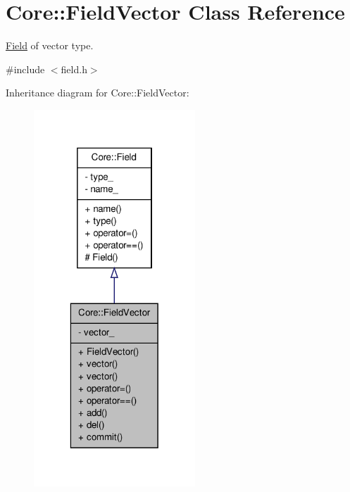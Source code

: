 \hypertarget{classCore_1_1FieldVector}{
\section{Core::FieldVector Class Reference}
\label{dc/d7f/classCore_1_1FieldVector}
}


\hyperlink{classCore_1_1Field}{Field} of vector type.  




{\ttfamily \#include $<$field.h$>$}



Inheritance diagram for Core::FieldVector:
\nopagebreak
\begin{figure}[H]
\begin{center}
\leavevmode
\includegraphics[width=172pt]{d9/d80/classCore_1_1FieldVector__inherit__graph}
\end{center}
\end{figure}


